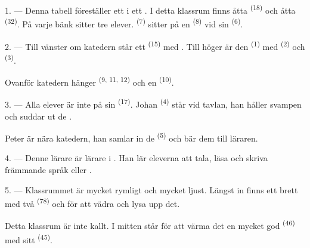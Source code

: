 \VUsaut{2.0mm}
\VUsaut{3.2mm}
\VUsaut{2.6mm}
\VUsaut{3.4mm}
\VUornamento{9pt}
\VUsaut{5.0mm}
\VUsaut{3.0mm}
\VUfilet{16mm}
\VUsaut{5.6mm}

\VUsaut{1.4mm}
\VUsaut{2.2mm}
\VUfilet{20mm}
\VUsaut{6.4mm}

\VUsaut{3.0mm}

1. --- Denna tabell föreställer ett  i ett
. I detta klassrum finns åtta 
\textsuperscript{(18)} och åtta  \textsuperscript{(32)}. På varje bänk sitter
tre elever.  \textsuperscript{(7)} sitter på en 
\textsuperscript{(8)} vid sin  \textsuperscript{(6)}.

2. --- Till vänster om katedern står ett  \textsuperscript{(15)} med
. Till höger är den  \textsuperscript{(1)} med
 \textsuperscript{(2)} och
 \textsuperscript{(3)}.

Ovanför katedern hänger  \textsuperscript{(9, 11, 12)} och en
 \textsuperscript{(10)}.

3. --- Alla elever är inte på sin  \textsuperscript{(17)}. Johan
\textsuperscript{(4)} står vid tavlan, han håller svampen och suddar ut de
.

Peter är nära katedern, han samlar in de  \textsuperscript{(5)}
och bär dem till läraren.

4. --- Denne lärare är lärare i . Han lär eleverna att tala, läsa och
skriva främmande språk  eller
.

5. --- Klassrummet är mycket rymligt och mycket ljust. Längst in finns ett brett
 med två  \textsuperscript{(78)} och
 för att vädra och lysa upp det.

Detta klassrum är inte kallt. I mitten står för att värma det en mycket god
 \textsuperscript{(46)} med sitt 
\textsuperscript{(45)}.

